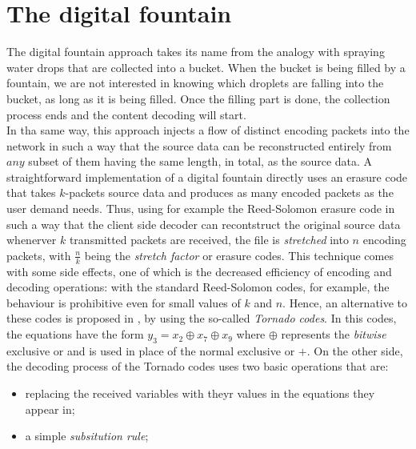 \section{The digital fountain}
The digital fountain approach takes its name from the analogy with spraying water drops that are collected into a bucket. When the bucket is being filled by a fountain, we are not interested in knowing which droplets are falling into the bucket, as long as it is being filled. Once the filling part is done, the collection process ends and the content decoding will start. \cite{Lu}\\
In tha same way, this approach injects a flow of distinct encoding packets into the network in such a way that the source data can be reconstructed entirely from $any$ subset of them having the same length, in total, as the source data.
A straightforward implementation of a digital fountain directly uses an erasure code that takes $k$-packets source data and produces as many encoded packets as the user demand needs. Thus, using for example the Reed-Solomon erasure code in such a way that the client side decoder can recontstruct the original source data whenerver $k$ transmitted packets are received, the file is \textit{stretched} into $n$ encoding packets, with $\frac{n}{k}$ being the \textit{stretch factor} or erasure codes. This technique comes with some side effects, one of which is the decreased efficiency of encoding and decoding operations: with the standard Reed-Solomon codes, for example, the behaviour is prohibitive even for small values of $k$ and $n$. Hence, an alternative to these codes is proposed in \cite{Byers}, by using the so-called \textit{Tornado codes}. In this codes, the equations have the form $y_3 = x_2 \oplus x_7 \oplus x_9$ where $\oplus$ represents the \textit{bitwise} exclusive or and is used in place of the normal exclusive or $+$. On the other side, the decoding process of the Tornado codes uses two basic operations that are:
\begin{itemize}
  \item replacing the received variables with theyr values in the equations they appear in;
  \item a simple \textit{subsitution rule};
\end{itemize}
